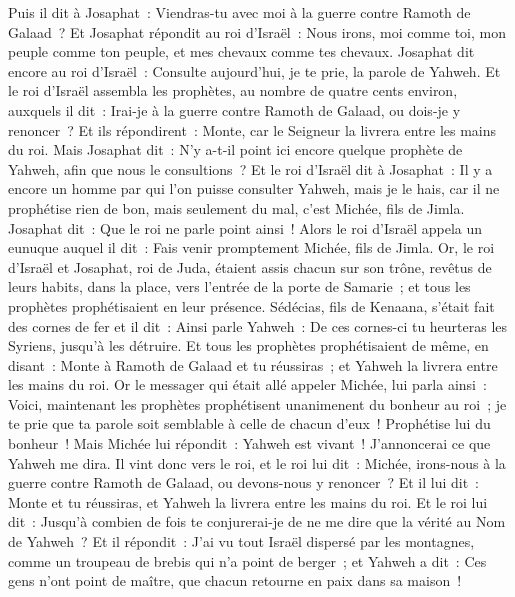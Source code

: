 \begin{multicols}{2}
Puis il dit à Josaphat~: Viendras-tu avec moi à la guerre contre Ramoth de Galaad~? Et Josaphat répondit au roi d'Israël~: Nous irons, moi comme toi, mon peuple comme ton peuple, et mes chevaux comme tes chevaux.
Josaphat dit encore au roi d'Israël~: Consulte aujourd'hui, je te prie, la parole de Yahweh.
Et le roi d'Israël assembla les prophètes, au nombre de quatre cents environ, auxquels il dit~: Irai-je à la guerre contre Ramoth de Galaad, ou dois-je y renoncer~? Et ils répondirent~: Monte, car le Seigneur la livrera entre les mains du roi.
Mais Josaphat dit~: N'y a-t-il point ici encore quelque prophète de Yahweh, afin que nous le consultions~?
Et le roi d'Israël dit à Josaphat~: Il y a encore un homme par qui l'on puisse consulter Yahweh, mais je le hais, car il ne prophétise rien de bon, mais seulement du mal, c'est Michée, fils de Jimla. Josaphat dit~: Que le roi ne parle point ainsi~!
Alors le roi d'Israël appela un eunuque auquel il dit~: Fais venir promptement Michée, fils de Jimla.
Or, le roi d'Israël et Josaphat, roi de Juda, étaient assis chacun sur son trône, revêtus de leurs habits, dans la place, vers l'entrée de la porte de Samarie~; et tous les prophètes prophétisaient en leur présence.
Sédécias, fils de Kenaana, s'était fait des cornes de fer et il dit~: Ainsi parle Yahweh~: De ces cornes-ci tu heurteras les Syriens, jusqu'à les détruire.
Et tous les prophètes prophétisaient de même, en disant~: Monte à Ramoth de Galaad et tu réussiras~; et Yahweh la livrera entre les mains du roi.
Or le messager qui était allé appeler Michée, lui parla ainsi~: Voici, maintenant les prophètes prophétisent unanimenent du bonheur au roi~; je te prie que ta parole soit semblable à celle de chacun d'eux~! Prophétise lui du bonheur~!
Mais Michée lui répondit~: Yahweh est vivant~! J'annoncerai ce que Yahweh me dira.
Il vint donc vers le roi, et le roi lui dit~: Michée, irons-nous à la guerre contre Ramoth de Galaad, ou devons-nous y renoncer~? Et il lui dit~: Monte et tu réussiras, et Yahweh la livrera entre les mains du roi.
Et le roi lui dit~: Jusqu'à combien de fois te conjurerai-je de ne me dire que la vérité au Nom de Yahweh~?
Et il répondit~: J'ai vu tout Israël dispersé par les montagnes, comme un troupeau de brebis qui n'a point de berger~; et Yahweh a dit~: Ces gens n'ont point de maître, que chacun retourne en paix dans sa maison~!

\end{multicols}
